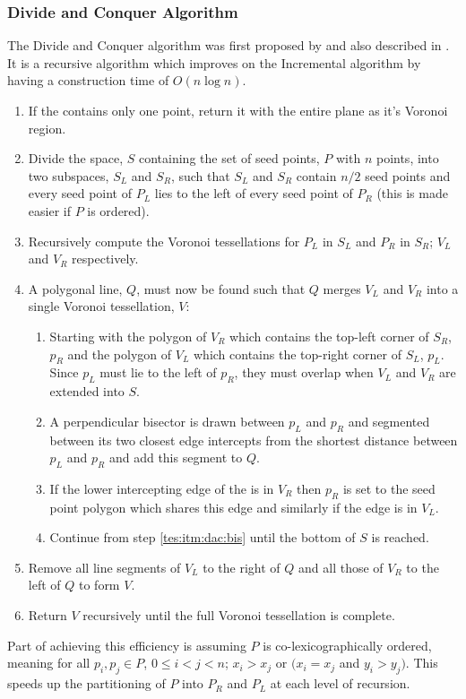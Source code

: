 \subsubsection{Divide and Conquer Algorithm}\label{tes:ssec:dac}
The Divide and Conquer algorithm was first proposed by \citet{shamos1975closest} and also described in \citet{okabe2009spatial}. It is a recursive algorithm which improves on the Incremental algorithm by having a construction time of $O(n\log n)$.
\begin{enumerate}
\item If the  contains only one point, return it with the entire plane as it's Voronoi region.
\item Divide the space, $S$ containing the set of seed points, $P$ with $n$ points, into two subspaces, $S_L$ and $S_R$, such that $S_L$ and $S_R$ contain $n/2$ seed points and every seed point of $P_L$ lies to the left of every seed point of $P_R$ (this is made easier if $P$ is ordered).
\item Recursively compute the Voronoi tessellations for $P_L$ in $S_L$ and $P_R$ in $S_R$; $V_L$ and $V_R$ respectively.
\item A polygonal line, $Q$, must now be found such that $Q$ merges $V_L$ and $V_R$ into a single Voronoi tessellation, $V$:
\begin{enumerate}
 \item Starting with the polygon of $V_R$ which contains the top-left corner of $S_R$, $p_R$ and the polygon of $V_L$ which contains the top-right corner of $S_L$, $p_L$. Since $p_L$ must lie to the left of $p_R$, they must overlap when $V_L$ and $V_R$ are extended into $S$.
 \item\label{tes:itm:dac:bis} A perpendicular bisector is drawn between $p_L$ and $p_R$ and segmented between its two closest edge intercepts from the shortest distance between $p_L$ and $p_R$ and add this segment to $Q$.
 \item If the lower intercepting edge of the is in $V_R$ then $p_R$ is set to the seed point polygon which shares this edge and similarly if the edge is in $V_L$.
 \item Continue from step \ref{tes:itm:dac:bis} until the bottom of $S$ is reached.
\end{enumerate}
\item Remove all line segments of $V_L$ to the right of $Q$ and all those of $V_R$ to the left of $Q$ to form $V$.
\item Return $V$ recursively until the full Voronoi tessellation is complete.
\end{enumerate}
Part of achieving this efficiency is assuming $P$ is co-lexicographically ordered, meaning for all $p_i,p_j \in P$, $0 \leq i < j < n$; $x_i > x_j$ or $(x_i = x_j$ and $y_i > y_j)$. This speeds up the partitioning of $P$ into $P_R$ and $P_L$ at each level of recursion.
%
